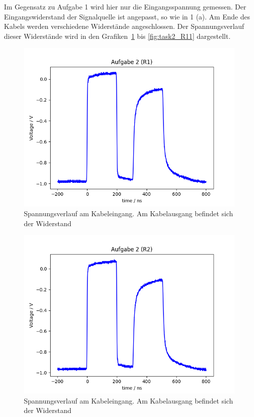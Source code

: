 \documentclass{article}
\begin{document}
Im Gegensatz zu Aufgabe 1 wird hier nur die Eingangsspannung gemessen. Der Eingangswiderstand der Signalquelle ist angepasst, so wie in 1 (a). Am Ende des Kabels werden verschiedene Widerstände angeschlossen. Der Spannungsverlauf dieser Widerstände wird in den Grafiken~\ref{fig:task2_R1} bis \ref{fig:task2_R11} dargestellt.


\begin{figure}[H]
\centering
\caption{Spannungsverlauf am Kabeleingang. Am Kabelausgang befindet sich der Widerstand }
\label{fig:task2_R1}
\includegraphics[scale=0.6]{bilder/task2/task2_R1.png}
\end{figure}



\begin{figure}[H]
\centering
\caption{Spannungsverlauf am Kabeleingang. Am Kabelausgang befindet sich der Widerstand }
\label{fig:task2_R2}
\includegraphics[scale=0.6]{bilder/task2/task2_R2.png}
\end{figure}
\end{document}

